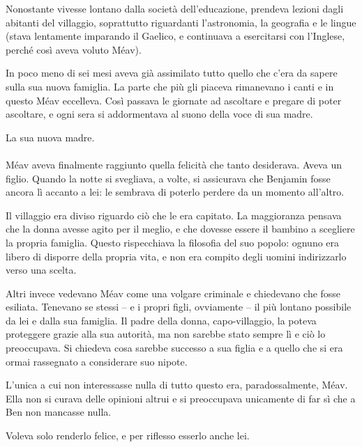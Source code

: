 \documentclass[a4paper,12pt]{book}
\begin{document}
Nonostante vivesse lontano dalla società dell'educazione, prendeva lezioni
dagli abitanti del villaggio, soprattutto riguardanti l'astronomia, la geografia
e le lingue (stava lentamente imparando il Gaelico, e continuava a esercitarsi
con l'Inglese, perché così aveva voluto Méav).

In poco meno di sei mesi aveva già assimilato tutto quello che c'era da sapere
sulla sua nuova famiglia. La parte che più gli piaceva rimanevano i canti e in
questo Méav eccelleva. Così passava le giornate ad ascoltare e pregare di
poter ascoltare, e ogni sera si addormentava al suono della voce di sua madre.

La sua nuova madre.

\paragraph{}
Méav aveva finalmente raggiunto quella felicità che tanto desiderava. Aveva un
figlio. Quando la notte si svegliava, a volte, si assicurava che Benjamin fosse
ancora lì accanto a lei: le sembrava di poterlo perdere da un momento
all'altro.

Il villaggio era diviso riguardo ciò che le era capitato. La maggioranza
pensava che la donna avesse agito per il meglio, e che dovesse essere il bambino
a scegliere la propria famiglia. Questo rispecchiava la filosofia del suo
popolo: ognuno era libero di disporre della propria vita, e non era compito
degli uomini indirizzarlo verso una scelta.

Altri invece vedevano Méav come una volgare criminale e chiedevano che fosse
esiliata. Tenevano se stessi -- e i propri figli, ovviamente -- il più
lontano possibile da lei e dalla sua famiglia. Il padre della donna,
capo-villaggio, la poteva proteggere grazie alla sua autorità, ma non sarebbe
stato sempre lì e ciò lo preoccupava. Si chiedeva cosa sarebbe successo a sua
figlia e a quello che si era ormai rassegnato a considerare suo nipote.

L'unica a cui non interessasse nulla di tutto questo era, paradossalmente,
Méav. Ella non si curava delle opinioni altrui e si preoccupava unicamente di
far sì che a Ben non mancasse nulla.

Voleva solo renderlo felice, e per riflesso esserlo anche lei.
\end{document}
